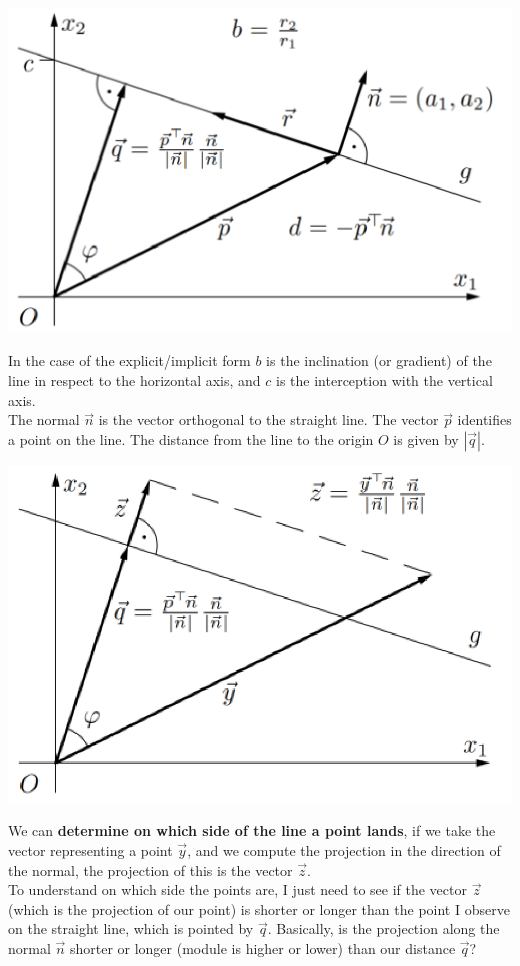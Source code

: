 \documentclass[11pt]{article}
\begin{document}
		\begin{center}
			\includegraphics[width=0.5\columnwidth]{img/NN/GeomInt1}
		\end{center}
		
		In the case of the explicit/implicit form $b$ is the inclination (or gradient) of the line in respect to the horizontal axis, and $c$ is the interception with the vertical axis.\\
		
		The normal $\vec{n}$ is the vector orthogonal to the straight line. The vector $\vec{p}$ identifies a point on the line. The distance from the line to the origin $O$ is given by $|\vec{q}|$.\\
		
		\begin{center}
			\includegraphics[width=0.65\columnwidth]{img/NN/GeomInt2}
		\end{center}
		
		We can \textbf{determine on which side of the line a point lands}, if we take the vector representing a point $\vec{y}$, and we compute the projection in the direction of the normal, the projection of this is 	the vector $\vec{z}$.\\
		
		To understand on which side the points are, I just need to see if the vector $\vec{z}$ (which is the projection of our point) is shorter or longer than the point I observe on the straight line, which is pointed by $\vec{q}$. Basically, is the projection along the normal $\vec{n}$ shorter or longer (module is higher or lower) than our distance $\vec{q}$? \\
		
\end{document}
